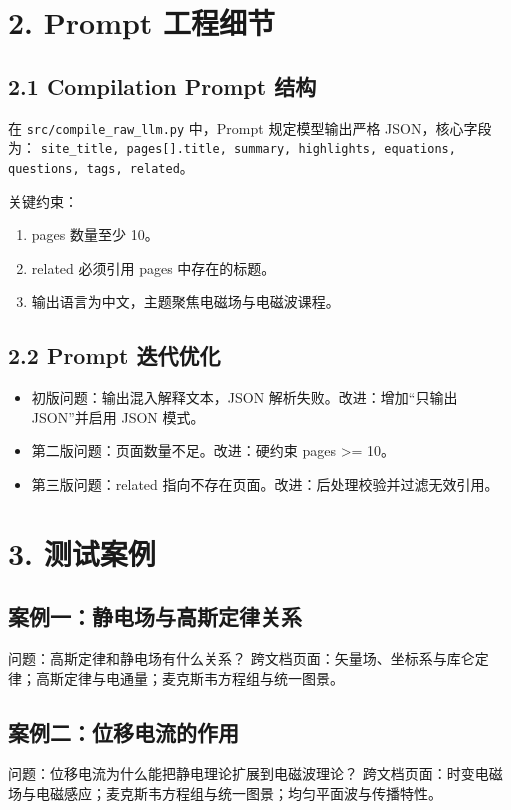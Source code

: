 \documentclass[UTF8]{ctexart}
\begin{document}
\section{2. Prompt 工程细节}
\subsection{2.1 Compilation Prompt 结构}
在 \texttt{src/compile\_raw\_llm.py} 中，Prompt 规定模型输出严格 JSON，核心字段为：
\texttt{site\_title, pages[].title, summary, highlights, equations, questions, tags, related}。

关键约束：
\begin{enumerate}[leftmargin=1.5em]
\item pages 数量至少 10。
\item related 必须引用 pages 中存在的标题。
\item 输出语言为中文，主题聚焦电磁场与电磁波课程。
\end{enumerate}

\subsection{2.2 Prompt 迭代优化}
\begin{itemize}[leftmargin=1.5em]
\item 初版问题：输出混入解释文本，JSON 解析失败。\newline 改进：增加“只输出 JSON”并启用 JSON 模式。
\item 第二版问题：页面数量不足。\newline 改进：硬约束 pages \textgreater= 10。
\item 第三版问题：related 指向不存在页面。\newline 改进：后处理校验并过滤无效引用。
\end{itemize}

\section{3. 测试案例}
\subsection{案例一：静电场与高斯定律关系}
问题：高斯定律和静电场有什么关系？\newline
跨文档页面：矢量场、坐标系与库仑定律；高斯定律与电通量；麦克斯韦方程组与统一图景。

\subsection{案例二：位移电流的作用}
问题：位移电流为什么能把静电理论扩展到电磁波理论？\newline
跨文档页面：时变电磁场与电磁感应；麦克斯韦方程组与统一图景；均匀平面波与传播特性。
\end{document}
